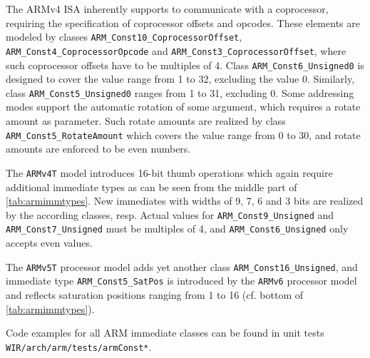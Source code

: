 The ARMv4 \gls{ISA} inherently supports to communicate with a coprocessor, requiring the specification of coprocessor offsets and opcodes.
These elements are modeled by classes \texttt{ARM\_Const10\_CoprocessorOffset}, \texttt{ARM\_Const4\_CoprocessorOpcode} and \texttt{ARM\_Const3\_CoprocessorOffset}, where such coprocessor offsets have to be multiples of 4.
Class \texttt{ARM\_Const6\_Unsigned0} is designed to cover the value range from 1 to 32, excluding the value 0.
Similarly, class \texttt{ARM\_Const5\_Unsigned0} ranges from 1 to 31, excluding 0.
Some addressing modes support the automatic rotation of some argument, which requires a rotate amount as parameter.
Such rotate amounts are realized by class \texttt{ARM\_Const5\_RotateAmount} which covers the value range from 0 to 30, and rotate amounts are enforced to be even numbers.

The \texttt{ARMv4T} model introduces 16-bit thumb operations which again require additional immediate types as can be seen from the middle part of \cref{tab:armimmtypes}.
New immediates with widths of 9, 7, 6 and 3 bits are realized by the according classes, resp.
Actual values for \texttt{ARM\_Const9\_Unsigned} and \texttt{ARM\_Const7\_Unsigned} must be multiples of 4, and \texttt{ARM\_Const6\_Unsigned} only accepts even values.

\enlargethispage{5mm}

The \texttt{ARMv5T} processor model adds yet another class \texttt{ARM\_Const16\_Unsigned}, and immediate type \texttt{ARM\_\-Const5\_SatPos} is introduced by the \texttt{ARMv6} processor model and reflects saturation positions ranging from 1 to 16 (cf. bottom of \cref{tab:armimmtypes}).

Code examples for all ARM immediate classes can be found in unit tests \texttt{WIR/arch/arm/tests/armConst*}.

